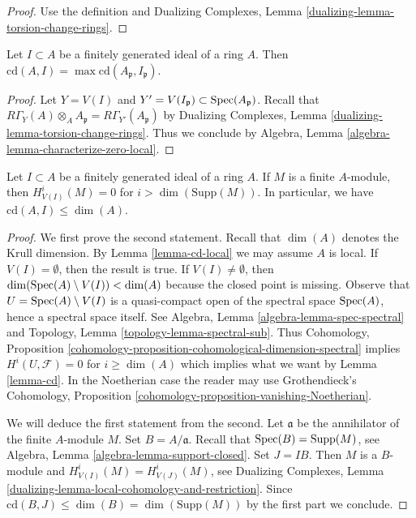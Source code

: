 \begin{proof}
Use the definition and
Dualizing Complexes, Lemma \ref{dualizing-lemma-torsion-change-rings}.
\end{proof}

\begin{lemma}
\label{lemma-cd-local}
Let $I \subset A$ be a finitely generated ideal of a ring $A$.
Then $\text{cd}(A, I) = \max \text{cd}(A_\mathfrak p, I_\mathfrak p)$.
\end{lemma}

\begin{proof}
Let $Y = V(I)$ and $Y' = V(I_\mathfrak p) \subset \mathop{\mathrm{Spec}}(A_\mathfrak p)$.
Recall that
$R\Gamma_Y(A) \otimes_A A_\mathfrak p = R\Gamma_{Y'}(A_\mathfrak p)$
by Dualizing Complexes, Lemma \ref{dualizing-lemma-torsion-change-rings}.
Thus we conclude by Algebra, Lemma \ref{algebra-lemma-characterize-zero-local}.
\end{proof}

\begin{lemma}
\label{lemma-cd-dimension}
Let $I \subset A$ be a finitely generated ideal of a ring $A$.
If $M$ is a finite $A$-module, then
$H^i_{V(I)}(M) = 0$ for $i > \dim(\text{Supp}(M))$.
In particular, we have $\text{cd}(A, I) \leq \dim(A)$.
\end{lemma}

\begin{proof}
We first prove the second statement.
Recall that $\dim(A)$ denotes the Krull dimension. By
Lemma \ref{lemma-cd-local} we may assume $A$ is local.
If $V(I) = \emptyset$, then the result is true.
If $V(I) \not = \emptyset$, then
$\dim(\mathop{\mathrm{Spec}}(A) \setminus V(I)) < \dim(A)$ because
the closed point is missing. Observe that
$U = \mathop{\mathrm{Spec}}(A) \setminus V(I)$ is a quasi-compact
open of the spectral space $\mathop{\mathrm{Spec}}(A)$, hence a spectral space itself.
See Algebra, Lemma \ref{algebra-lemma-spec-spectral} and
Topology, Lemma \ref{topology-lemma-spectral-sub}.
Thus Cohomology, Proposition
\ref{cohomology-proposition-cohomological-dimension-spectral}
implies $H^i(U, \mathcal{F}) = 0$ for $i \geq \dim(A)$
which implies what we want by Lemma \ref{lemma-cd}.
In the Noetherian case the reader may use
Grothendieck's Cohomology, Proposition
\ref{cohomology-proposition-vanishing-Noetherian}.

\medskip\noindent
We will deduce the first statement from the second.
Let $\mathfrak a$ be the annihilator of the finite $A$-module $M$.
Set $B = A/\mathfrak a$. Recall that $\mathop{\mathrm{Spec}}(B) = \text{Supp}(M)$, see
Algebra, Lemma \ref{algebra-lemma-support-closed}.
Set $J = IB$. Then $M$ is a $B$-module
and $H^i_{V(I)}(M) = H^i_{V(J)}(M)$, see
Dualizing Complexes, Lemma
\ref{dualizing-lemma-local-cohomology-and-restriction}.
Since $\text{cd}(B, J) \leq \dim(B) = \dim(\text{Supp}(M))$
by the first part we conclude.
\end{proof}

